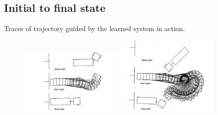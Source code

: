 \subsection{Initial to final state}
Traces of trajectory guided by the learned system in action.
\begin{figure}[H]
    \centering
    \includegraphics[width=0.45\textwidth]{figs/state.png}
    \label{fig:state}
    \includegraphics[width=0.45\textwidth]{figs/state2.png}
    \label{fig:state2}
\end{figure}